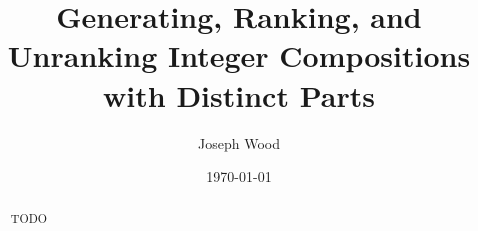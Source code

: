 \documentclass{article}
\title{Generating, Ranking, and Unranking Integer Compositions with Distinct Parts}
\author{Joseph Wood}
\date{\today}
\theoremstyle{definition}
\begin{document}
\maketitle

\begin{abstract}

TODO
    
\end{abstract}

\end{document}
